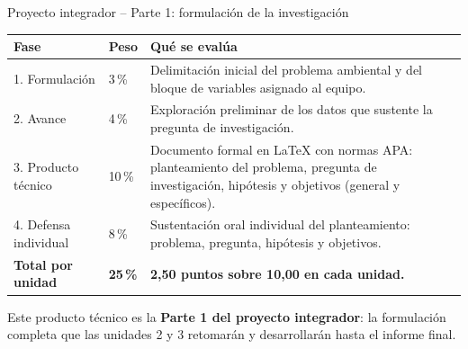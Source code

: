 \documentclass[aspectratio=169,11pt]{beamer}
\begin{document}
\begin{frame}{Proyecto integrador -- Parte 1: formulación de la investigación}
\footnotesize
\centering
\renewcommand{\arraystretch}{0.95}
\begin{tabularx}{\textwidth}{L{2.2cm}C{1.6cm}Y}
\toprule
\textbf{Fase} & \textbf{Peso} & \textbf{Qué se evalúa} \\
. Formulación & 3\,\% & Delimitación inicial del problema ambiental y del bloque de variables asignado al equipo. \\
2. Avance & 4\,\% & Exploración preliminar de los datos que sustente la pregunta de investigación. \\
3. Producto técnico & 10\,\% & Documento formal en \LaTeX{} con normas APA: planteamiento del problema, pregunta de investigación, hipótesis y objetivos (general y específicos). \\
4. Defensa individual & 8\,\% & Sustentación oral individual del planteamiento: problema, pregunta, hipótesis y objetivos. \\
\midrule
\textbf{Total por unidad} & \textbf{25\,\%} & \textbf{2,50 puntos sobre 10,00 en cada unidad.} \\
\bottomrule
\end{tabularx}
\vspace{0.02cm}
\begin{warnbox}[top=2pt,bottom=2pt]
Este producto técnico es la \textbf{Parte 1 del proyecto integrador}: la formulación completa que las unidades 2 y 3 retomarán y desarrollarán hasta el informe final.
\end{warnbox}
\end{frame}
\end{document}
